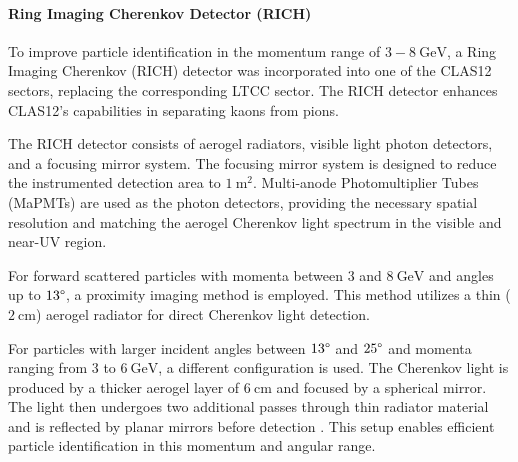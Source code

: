\paragraph{Ring Imaging Cherenkov Detector (RICH)}
\label{par::rich}
    To improve particle identification in the momentum range of $3 - 8 ~\text{GeV}$, a Ring Imaging Cherenkov (RICH) detector was incorporated into one of the CLAS12 sectors, replacing the corresponding LTCC sector.
    The RICH detector enhances CLAS12's capabilities in separating kaons from pions.

    The RICH detector consists of aerogel radiators, visible light photon detectors, and a focusing mirror system.
    The focusing mirror system is designed to reduce the instrumented detection area to $1 ~\text{m}^2$.
    Multi-anode Photomultiplier Tubes (MaPMTs) are used as the photon detectors, providing the necessary spatial resolution and matching the aerogel Cherenkov light spectrum in the visible and near-UV region.

    For forward scattered particles with momenta between $3$ and $8 ~\text{GeV}$ and angles up to $13\degree$, a proximity imaging method is employed.
    This method utilizes a thin ($2 ~\text{cm}$) aerogel radiator for direct Cherenkov light detection.

    For particles with larger incident angles between $13\degree$ and $25\degree$ and momenta ranging from $3$ to $6 ~\text{GeV}$, a different configuration is used.
    The Cherenkov light is produced by a thicker aerogel layer of $6 ~\text{cm}$ and focused by a spherical mirror.
    The light then undergoes two additional passes through thin radiator material and is reflected by planar mirrors before detection \cite{contalbrigo2020}.
    This setup enables efficient particle identification in this momentum and angular range.
